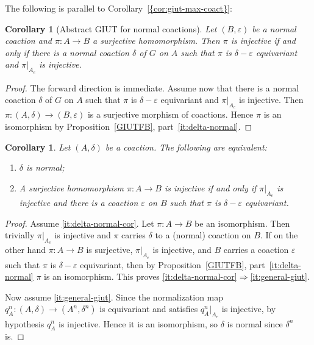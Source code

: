 \documentclass[12pt]{amsart}
\theoremstyle{plain}
\newtheorem{cor}[theorem]{Corollary}
\theoremstyle{remark}
\theoremstyle{definition}
\numberwithin{equation}{section}
\theoremstyle{plain}
\theoremstyle{definition}
\theoremstyle{remark}
\begin{document}
The following is parallel to {Corollary~\textup{\ref{{cor:giut-max-coact}}}}:

\begin{cor}[Abstract GIUT for normal coactions]
\label{cor:giut-nor-coact} Let $(B, \varepsilon)$ be a normal coaction and
$\pi:A\to B$  a surjective homomorphism. Then $\pi$ is
injective if and only if there is a normal
coaction $\delta$ of $G$ on $A$ such that $\pi$ is $\delta-\varepsilon$ equivariant and
$\pi\vert_{A_e}$ is injective.
\end{cor}

\begin{proof} The forward direction is immediate. Assume now that there is a normal coaction
$\delta$ of $G$ on $A$ such that $\pi$ is $\delta-\varepsilon$ equivariant and
$\pi\vert_{A_e}$ is injective.
Then $\pi: (A, \delta)\to (B, \varepsilon)$ is a surjective morphism of coactions. Hence $\pi$
is an isomorphism by Proposition~\ref{GIUTFB}, part~\eqref{it:delta-normal}.
\end{proof}

\begin{cor}\label{cor:characterise-normal} Let $(A, \delta)$ be a coaction. The following are equivalent:
\begin{enumerate}
\item\label{it:delta-normal-cor} $\delta$ is normal;
\item\label{it:general-giut} A surjective homomorphism $\pi:A\to B$ is injective if and only if $\pi\vert_{A_e}$ is injective
and
there
is a coaction $\varepsilon$ on $B$ such that $\pi$ is $\delta-\varepsilon$ equivariant.
\end{enumerate}
\end{cor}

\begin{proof}
Assume \eqref{it:delta-normal-cor}. Let $\pi:A\to B$ be an isomorphism. Then trivially $\pi\vert_{A_e}$ is injective and $\pi$ carries
$\delta$ to a (normal) coaction on $B$. If on the other hand $\pi:A\to B$ is surjective, $\pi\vert_{A_e}$ is injective, and
$B$ carries a coaction $\varepsilon$ such that $\pi$ is $\delta-\varepsilon$ equivariant, then by Proposition~\ref{GIUTFB},
part~\eqref{it:delta-normal} $\pi$ is an isomorphism. This proves \eqref{it:delta-normal-cor}$\Rightarrow$\eqref{it:general-giut}.

Now assume \eqref{it:general-giut}. Since the normalization map $q_A^n:(A, \delta)\to (A^{n}, \delta^{n})$
is equivariant and satisfies $q_A^n\vert_{A_e}$ is injective, by hypothesis $q_A^n$ is injective. Hence it is an isomorphism,
so $\delta$ is normal since $\delta^n$ is.
\end{proof}
\end{document}
